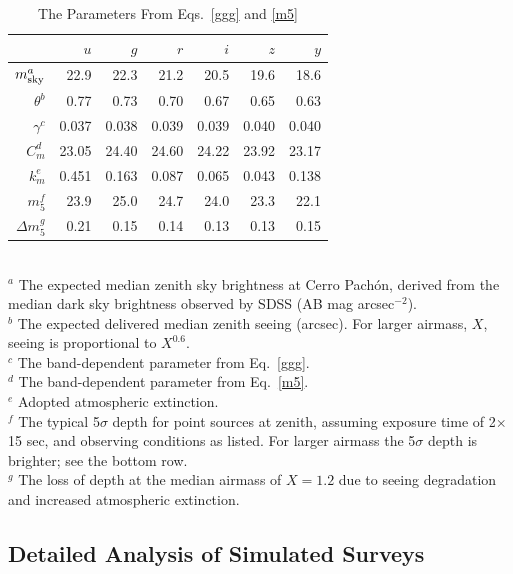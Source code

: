 \documentclass{emulateapj}
\begin{document}
\begin{table}
\caption{The Parameters From Eqs.~\ref{ggg} and \ref{m5}}
\begin{tabular}{|r|r|r|r|r|r|r|}
\hline  
              &   $u$  &   $g$   & $r$   &  $i$  & $z$  & $y$  \\
\hline  
   $m_{\rm sky}^a$ &   22.9    & 22.3    & 21.2    & 20.5    & 19.6    &  18.6  \\
   $\theta^b$      &   0.77    & 0.73    & 0.70    & 0.67    &  0.65   &  0.63  \\
  $\gamma^c$       &   0.037   & 0.038   & 0.039   & 0.039   & 0.040   & 0.040 \\
  $C_m^d$        &   23.05   & 24.40   & 24.60   & 24.22   & 23.92   & 23.17 \\
    $k_m^e$       &    0.451   &  0.163   &  0.087   &  0.065   &  0.043   &  0.138 \\
    $m_5^f$        &   23.9    & 25.0    & 24.7    &  24.0   & 23.3    & 22.1  \\
    $\Delta m_5^g$ &   0.21    & 0.15   & 0.14    &  0.13   & 0.13    & 0.15  \\
\hline                         
\end{tabular}
  \\ \vskip 0.05in
  $^a$ The expected median zenith sky brightness at Cerro Pach\'on, derived 
       from the median dark sky brightness observed by SDSS (AB mag arcsec$^{-2}$). \\
  $^b$ The expected delivered median zenith seeing (arcsec). For larger
       airmass, $X$, seeing is proportional to $X^{0.6}$. \\
  $^c$ The band-dependent parameter from Eq.~\ref{ggg}. \\
  $^d$ The band-dependent parameter from Eq.~\ref{m5}. \\
  $^e$ Adopted atmospheric extinction. \\
  $^f$ The typical 5$\sigma$ depth for point sources at zenith, assuming exposure time of 
       2$\times$15 sec, and observing conditions as listed. For larger
       airmass the 5$\sigma$ depth is brighter; see the bottom row. \\
  $^g$ The loss of depth at the median airmass of $X=1.2$ due to seeing degradation 
       and increased atmospheric extinction. \\
\end{table}



\subsection{  Detailed Analysis of Simulated Surveys  } 
\end{document}
